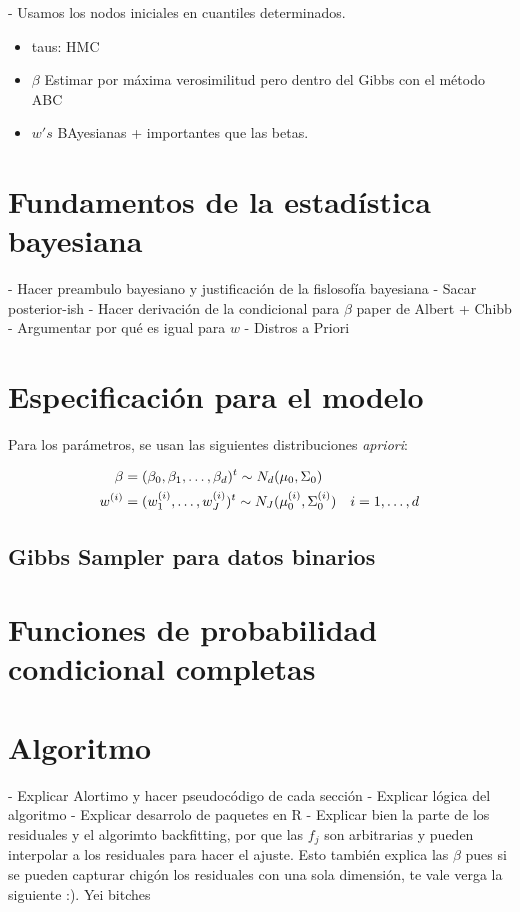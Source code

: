 \documentclass[../Main/Main.tex]{subfiles}
\begin{document}
- Usamos los nodos iniciales en cuantiles determinados.\\
\begin{itemize}
\item taus: HMC
\item $\beta$ Estimar por máxima verosimilitud pero dentro del Gibbs con el método ABC
\item $w's$ BAyesianas + importantes que las betas.
\end{itemize}


\section{Fundamentos de la estadística bayesiana}

- Hacer preambulo bayesiano y justificación de la fislosofía bayesiana
- Sacar posterior-ish
- Hacer derivación de la condicional para $\beta$ paper de Albert + Chibb
- Argumentar por qué es igual para $w$
- Distros a Priori

\section{Especificación para el modelo}
Para los parámetros, se usan las siguientes distribuciones \textit{apriori}:

\begin{align}
	\mathbf{\beta} &= (\beta_0,\beta_1,\ldots,\beta_d)^t \sim N_d(\mu_0, \Sigma_0) \\
	w^{(i)} &= (w^{(i)}_1,\ldots,w^{(i)}_J)^t \sim N_J(\mu^{(i)}_0,\Sigma^{(i)}_0) \quad i=1,\ldots,d
\end{align}

\subsection{Gibbs Sampler para datos binarios}

\section{Funciones de probabilidad condicional completas}


\section{Algoritmo}

- Explicar Alortimo y hacer pseudocódigo de cada sección
- Explicar lógica del algoritmo
- Explicar desarrolo de paquetes en R
- Explicar bien la parte de los residuales y el algorimto backfitting, por que las $f_j$ son arbitrarias y pueden interpolar a los residuales para hacer el ajuste. Esto también explica las $\beta$ pues si se pueden capturar chigón los residuales con una sola dimensión, te vale verga la siguiente :). Yei bitches
\end{document}
